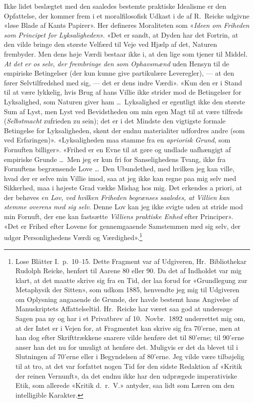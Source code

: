 \documentclass[12pt,a4paper]{article}
\newcommand{\apage}[1]{\marginnote{\footnotesize\textit{[#1]}}}
\begin{document}
Ikke lidet beslægtet med den saaledes bestemte praktiske Idealisme er den
Opfattelse, der kommer frem i et moralfilosofisk Udkast i de af R.\
Reicke udgivne «løse Blade af Kants Papirer». Her defineres Moraliteten
som «\emph{Ideen om Friheden som Principet for Lyksaligheden}». «Det er sandt,
at Dyden har det Fortrin, at den vilde bringe den største Velfærd til
Veje ved Hjælp af det, Naturen frembyder. Men dens høje Værdi bestaar
ikke i, at den lige som tjener til Middel. \emph{At det er os selv, der
frembringe den som Ophavsmænd} uden Hensyn til de empiriske Betingelser
(der kun kunne give partikulære Leveregler), --- at den fører
Selvtilfredshed med sig, --- det er dens indre Værdi». «Kun den er i
Stand til at være lykkelig, hvis Brug af hans Villie ikke strider mod de
Betingelser for Lyksalighed, som Naturen giver ham \ldots\ Lyksalighed er
egentligt ikke den største Sum af Lyst, men Lyst ved Bevidstheden om min
egen Magt til at være tilfreds (\emph{Selbstmacht} zufrieden zu sein);
det er i det Mindste den vigtigste formale Betingelse for Lyksaligheden,
skønt der endnu materialiter udfordres andre (som ved
Erfaringen)». «Lyksaligheden maa stamme fra en \emph{apriorisk Grund}, som
Fornuften billiger». «Frihed er en Evne til at gøre og undlade
uafhængigt af empiriske Grunde \ldots\ Men jeg er kun fri for
Sanselighedens Tvang, ikke fra Fornuftens begrænsende Love \ldots\ Den
Ubundethed, med hvilken jeg kan ville, hvad der er selve min Villie imod,
saa at jeg ikke kan regne paa mig selv med Sikkerhed, maa i højeste Grad
vække Mishag hos mig. Det erkendes a priori, at der behøves \emph{en Lov, ved
hvilken Friheden begrænses saaledes, at Villien kan stemme overens med
sig selv}. Denne Lov kan jeg ikke svigte uden at stride mod min Fornuft,
der ene kan fastsætte \emph{Villiens praktiske \apage{43} Enhed} efter Principer». «Det er
Frihed efter Lovene for gennemgaaende Samstemmen med sig selv, der udgør
Personlighedens Værdi og Værdighed».\footnote{Lose Blätter I.\
p.\ 10--15. Dette Fragment var af Udgiveren, Hr.\ Bibliothekar Rudolph
Reicke, henført til Aarene 80 eller 90. Da det af Indholdet var mig
klart, at det maatte skrive sig fra en Tid, der laa forud for
«Grundlegung zur Metaphysik der Sitten», som udkom 1885, henvendte jeg
mig til Udgiveren om Oplysning angaaende de Grunde, der havde bestemt
hans Angivelse af Manuskriptets Affattelseltid. Hr.\ Reicke har været saa
god at undersøge Sagen paa ny og har i et Privatbrev af 10.\ Novbr.\ 1892
underrettet mig om, at der Intet er i Vejen for, at Fragmentet kan skrive
sig fra 70'erne, men at han dog efter Skrifttrækkene snarere vilde
henføre det til 80'erne; til 90'erne anser han det nu for umuligt at
henføre det. Muligvis er det da blevet til i Slutningen af 70'erne eller i
Begyndelsen af 80'erne. Jeg vilde være tilbøjelig til at tro, at det var
forfattet nogen Tid før den sidste Redaktion af «Kritik der reinen
Vernunft», da det endnu ikke har den udprægede imperativiske Etik, som
allerede «Kritik d.\ r.\ V.» antyder, saa lidt som Læren om den
intelligible Karakter.}
\end{document}
